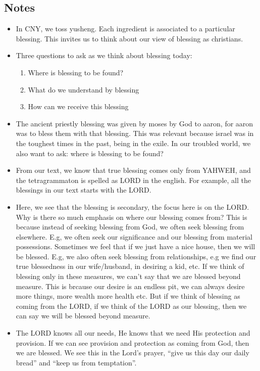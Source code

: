 \subsection*{Notes}
\begin{itemize}
  \item{In CNY, we toss yusheng. Each ingredient is associated to a particular blessing. This invites us to think about our view of blessing as christians.}
  \item{Three questions to ask as we think about blessing today:
    \begin{enumerate}
      \item Where is blessing to be found?
      \item What do we understand by blessing
      \item How can we receive this blessing
    \end{enumerate}}
  \item{The ancient priestly blessing was given by moses by God to aaron, for aaron was to bless them with that blessing. This was relevant because israel was in the toughest times in the past, being in the exile. In our troubled world, we also want to ask: where is blessing to be found?}
  \item{From our text, we know that true blessing comes only from YAHWEH, and the tetragrammaton is spelled as LORD in the english. For example, all the blessings in our text starts with the LORD. }
  \item{Here, we see that the blessing is secondary, the focus here is on the LORD. Why is there so much emphasis on where our blessing comes from? This is because instead of seeking blessing from God, we often seek blessing from elsewhere. E.g, we often seek our significance and our blessing from material possessions. Sometimes we feel that if we just have a nice house, then we will be blessed. E.g, we also often seek blessing from relationships, e.g we find our true blessedness in our wife/husband, in desiring a kid, etc. If we think of blessing only in these measures, we can’t say that we are blessed beyond measure. This is brcause our desire is an endless pit, we can always desire more things, more wealth more health etc. But if we think of blessing as coming from the LORD, if we think of the LORD as our blessing, then we can say we will be blessed beyond measure.}
  \item{The LORD knows all our needs, He knows that we need His protection and provision. If we can see provision and protection as coming from God, then we are blessed. We see this in the Lord’s prayer, “give us this day our daily bread” and “keep us from temptation”. }

\end{itemize}
